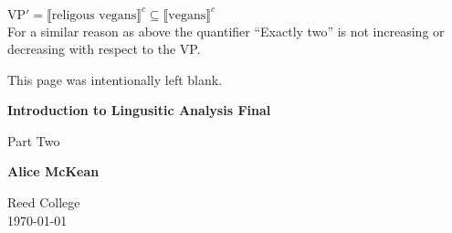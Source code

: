 \documentclass[20pt]{article}
\newcommand{\brackets}[1]{\ensuremath{\llbracket \text{#1}\rrbracket^{c}}}
\begin{document}
\begin{enumerate}[label=(\alph*)]
    $\text{VP}' = \brackets{religous vegans} \subseteq \brackets{vegans}$ \\
    For a similar reason as above the quantifier ``Exactly two'' is not
    increasing or decreasing with respect to the VP.
\end{enumerate}

\newpage

\newpage
\begin{center}
  \thispagestyle{empty}
  This page was intentionally left blank.
\end{center}
\newpage


\begin{titlepage}
    \begin{center}
        \vspace*{1cm}
 
        \Huge
        \textbf{Introduction to Lingusitic Analysis Final}
 
        \vspace{0.5cm}
        \LARGE
        Part Two
 
        \vspace{0.5cm}
 
        \textbf{Alice McKean}
 
        \vfill
 
        \Large
        Reed College\\
        \today
    \end{center}
\end{titlepage}
\end{document}

